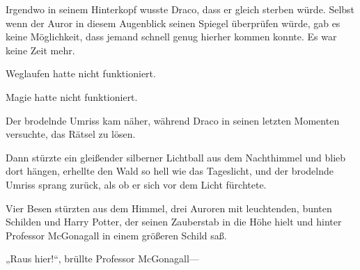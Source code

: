 Irgendwo in seinem Hinterkopf wusste Draco, dass er gleich sterben würde. Selbst wenn der Auror in diesem Augenblick seinen Spiegel überprüfen würde, gab es keine Möglichkeit, dass jemand schnell genug hierher kommen konnte. Es war keine Zeit mehr.

Weglaufen hatte nicht funktioniert.

Magie hatte nicht funktioniert.

Der brodelnde Umriss kam näher, während Draco in seinen letzten Momenten versuchte, das Rätsel zu lösen.

Dann stürzte ein gleißender silberner Lichtball aus dem Nachthimmel und blieb dort hängen, erhellte den Wald so hell wie das Tageslicht, und der brodelnde Umriss sprang zurück, als ob er sich vor dem Licht fürchtete.

Vier Besen stürzten aus dem Himmel, drei Auroren mit leuchtenden, bunten Schilden und Harry Potter, der seinen Zauberstab in die Höhe hielt und hinter Professor McGonagall in einem größeren Schild saß.

„Raus hier!“, brüllte Professor McGonagall—


